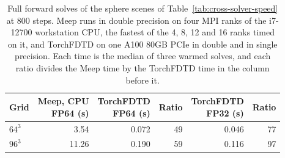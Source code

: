 \begin{table}[tbp]
\centering
\small
\renewcommand{\arraystretch}{1.15}
\caption{Full forward solves of the sphere scenes of Table~\ref{tab:cross-solver-speed} at 800 steps. Meep runs in double precision on four MPI ranks of the i7-12700 workstation CPU, the fastest of the 4, 8, 12 and 16 ranks timed on it, and TorchFDTD on one A100 80GB PCIe in double and in single precision. Each time is the median of three warmed solves, and each ratio divides the Meep time by the TorchFDTD time in the column before it.}
\label{tab:cpu-gpu-precision}
\begin{tabular}{@{}lrrrrr@{}}
\toprule
Grid & \shortstack{Meep, CPU\\FP64 (s)} & \shortstack{TorchFDTD\\FP64 (s)} & Ratio & \shortstack{TorchFDTD\\FP32 (s)} & Ratio \\
\midrule
$64^{3}$ & 3.54 & 0.072 & 49 & 0.046 & 77 \\
$96^{3}$ & 11.26 & 0.190 & 59 & 0.116 & 97 \\
\bottomrule
\end{tabular}
\end{table}
